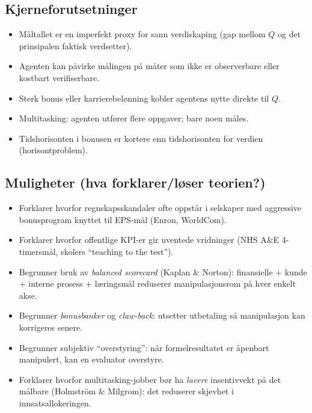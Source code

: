 \subsection*{Kjerneforutsetninger}
\begin{itemize}
\item Måltallet er en imperfekt proxy for sann verdiskaping (gap mellom $Q$ og det prinsipalen faktisk verdsetter).
\item Agenten kan påvirke målingen på måter som ikke er observerbare eller kostbart verifiserbare.
\item Sterk bonus eller karrierebelønning kobler agentens nytte direkte til $Q$.
\item Multitasking: agenten utfører flere oppgaver; bare noen måles.
\item Tidshorisonten i bonusen er kortere enn tidshorisonten for verdien (horisontproblem).
\end{itemize}

\subsection*{Muligheter (hva forklarer/løser teorien?)}
\begin{itemize}
\item Forklarer hvorfor regnskapsskandaler ofte oppstår i selskaper med aggressive bonusprogram knyttet til EPS-mål (Enron, WorldCom).
\item Forklarer hvorfor offentlige KPI-er gir uventede vridninger (NHS A\&E 4-timersmål, skolers ``teaching to the test'').
\item Begrunner bruk av \emph{balanced scorecard} (Kaplan \& Norton): finansielle + kunde + interne prosess + læringsmål reduserer manipulasjonsrom på hver enkelt akse.
\item Begrunner \emph{bonusbanker} og \emph{claw-back}: utsetter utbetaling så manipulasjon kan korrigeres senere.
\item Begrunner subjektiv ``overstyring'': når formelresultatet er åpenbart manipulert, kan en evaluator overstyre.
\item Forklarer hvorfor multitasking-jobber bør ha \emph{lavere} insentivvekt på det målbare (Holmström \& Milgrom): det reduserer skjevhet i innsatsallokeringen.
\end{itemize}

